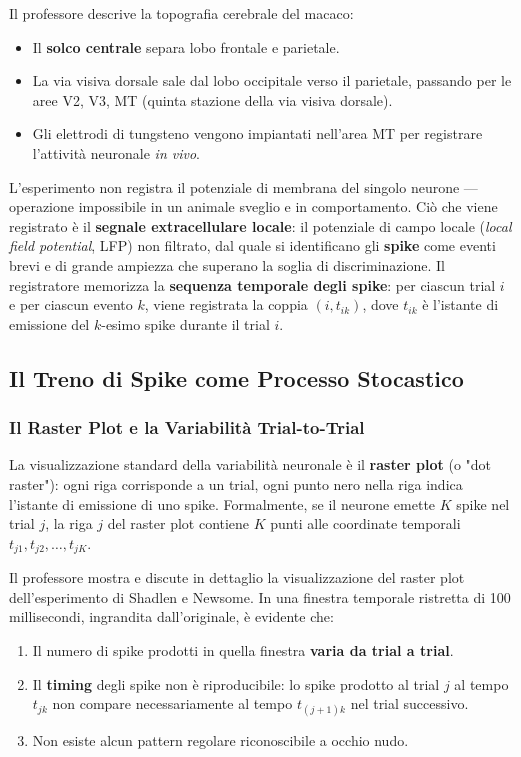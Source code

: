 Il professore descrive la topografia cerebrale del macaco:
\begin{itemize}
    \item Il \textbf{solco centrale} separa lobo frontale e parietale.
    \item La via visiva dorsale sale dal lobo occipitale verso il parietale, passando per le aree V2, V3, MT (quinta stazione della via visiva dorsale).
    \item Gli elettrodi di tungsteno vengono impiantati nell'area MT per registrare l'attività neuronale \textit{in vivo}.
\end{itemize}

L'esperimento non registra il potenziale di membrana del singolo neurone — operazione impossibile in un animale sveglio e in comportamento. Ciò che viene registrato è il \textbf{segnale extracellulare locale}: il potenziale di campo locale (\textit{local field potential}, LFP) non filtrato, dal quale si identificano gli \textbf{spike} come eventi brevi e di grande ampiezza che superano la soglia di discriminazione. Il registratore memorizza la \textbf{sequenza temporale degli spike}: per ciascun trial $i$ e per ciascun evento $k$, viene registrata la coppia $(i, t_{ik})$, dove $t_{ik}$ è l'istante di emissione del $k$-esimo spike durante il trial $i$.


\subsection{Il Treno di Spike come Processo Stocastico}

\subsubsection{Il Raster Plot e la Variabilità Trial-to-Trial}

La visualizzazione standard della variabilità neuronale è il \textbf{raster plot} (o "dot raster"): ogni riga corrisponde a un trial, ogni punto nero nella riga indica l'istante di emissione di uno spike. Formalmente, se il neurone emette $K$ spike nel trial $j$, la riga $j$ del raster plot contiene $K$ punti alle coordinate temporali $t_{j1}, t_{j2}, \ldots, t_{jK}$.

Il professore mostra e discute in dettaglio la visualizzazione del raster plot dell'esperimento di Shadlen e Newsome. In una finestra temporale ristretta di 100 millisecondi, ingrandita dall'originale, è evidente che:
\begin{enumerate}
    \item Il numero di spike prodotti in quella finestra \textbf{varia da trial a trial}.
    \item Il \textbf{timing} degli spike non è riproducibile: lo spike prodotto al trial $j$ al tempo $t_{jk}$ non compare necessariamente al tempo $t_{(j+1)k}$ nel trial successivo.
    \item Non esiste alcun pattern regolare riconoscibile a occhio nudo.
\end{enumerate}

